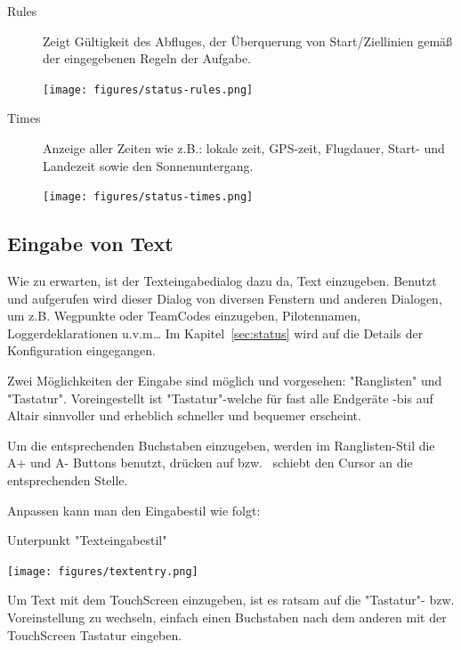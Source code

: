 \begin{description}
\item[Rules] Zeigt Gültigkeit des Abfluges, der Überquerung von Start/Ziellinien gemäß der eingegebenen Regeln der Aufgabe.
\begin{center}
\texttt{[image: figures/status-rules.png]}
\end{center}

\item[Times] Anzeige aller Zeiten wie z.B.: lokale zeit, GPS-zeit, Flugdauer, Start-  und Landezeit sowie den Sonnenuntergang.
\begin{center}
\texttt{[image: figures/status-times.png]}
\end{center}
\end{description}

\subsection*{Eingabe von Text} \label{sec:textentry}

Wie zu erwarten, ist der Texteingabedialog dazu da, Text einzugeben.
Benutzt und aufgerufen wird dieser Dialog von diversen Fenstern und anderen Dialogen, um z.B. Wegpunkte oder TeamCodes  einzugeben, Pilotennamen, Loggerdeklarationen u.v.m\dots
Im Kapitel~\ref{sec:status} wird auf die Details der Konfiguration eingegangen.

Zwei Möglichkeiten der Eingabe sind möglich und vorgesehen:  "Ranglisten"  und "Tastatur".
Voreingestellt ist "Tastatur"-welche für fast alle Endgeräte -bis auf \textsf{Altair} sinnvoller und erheblich schneller und bequemer erscheint.

Um die entsprechenden  Buchstaben einzugeben, werden im Ranglisten-Stil die A+ und  A- Buttons benutzt, drücken auf  \button{$<$} bzw.\   \button{$>$} schiebt den Cursor an die entsprechenden Stelle.

Anpassen kann man den Eingabestil wie folgt:

\begin{quote}
\blink{}\blink{}
\end{quote} Unterpunkt "Texteingabestil"

\begin{center}
\texttt{[image: figures/textentry.png]}
\end{center}

Um Text mit dem TouchScreen einzugeben, ist es ratsam auf die "Tastatur"- bzw. Voreinstellung zu wechseln, einfach einen Buchstaben nach dem anderen mit der TouchScreen Tastatur eingeben.

